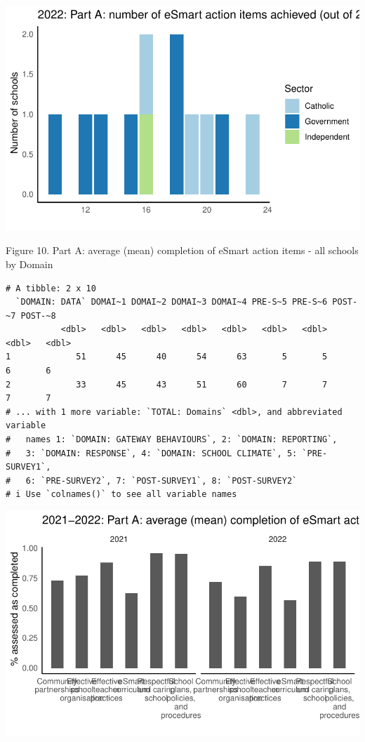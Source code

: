 \documentclass[
  letterpaper,
  DIV=11,
  numbers=noendperiod]{scrartcl}
\begin{document}
\includegraphics{report_files/figure-pdf/unnamed-chunk-9-2.pdf}

Figure 10. Part A: average (mean) completion of eSmart action items -
all schools by Domain

\begin{verbatim}
# A tibble: 2 x 10
  `DOMAIN: DATA` DOMAI~1 DOMAI~2 DOMAI~3 DOMAI~4 PRE-S~5 PRE-S~6 POST-~7 POST-~8
           <dbl>   <dbl>   <dbl>   <dbl>   <dbl>   <dbl>   <dbl>   <dbl>   <dbl>
1             51      45      40      54      63       5       5       6       6
2             33      45      43      51      60       7       7       7       7
# ... with 1 more variable: `TOTAL: Domains` <dbl>, and abbreviated variable
#   names 1: `DOMAIN: GATEWAY BEHAVIOURS`, 2: `DOMAIN: REPORTING`,
#   3: `DOMAIN: RESPONSE`, 4: `DOMAIN: SCHOOL CLIMATE`, 5: `PRE-SURVEY1`,
#   6: `PRE-SURVEY2`, 7: `POST-SURVEY1`, 8: `POST-SURVEY2`
# i Use `colnames()` to see all variable names
\end{verbatim}

\includegraphics{report_files/figure-pdf/unnamed-chunk-12-1.pdf}
\end{document}
